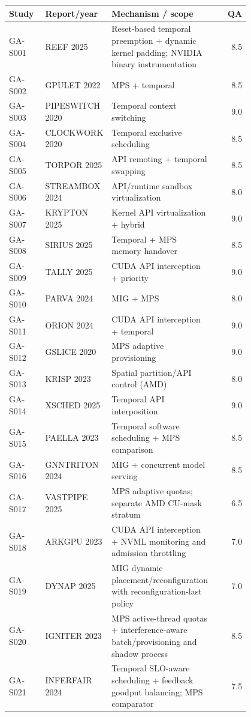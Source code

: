 \documentclass[12pt,a4paper]{article}
\begin{document}
\begin{longtable}{P{0.15\linewidth}P{0.25\linewidth}P{0.4\linewidth}r}
\toprule Study & Report/year & Mechanism / scope & QA\\\midrule\endhead
GA-S001 & REEF 2025 \cite{reef} & Reset-based temporal preemption + dynamic kernel padding; NVIDIA binary instrumentation & 8.5\\
GA-S002 & GPULET 2022 \cite{gpulet} & MPS + temporal & 8.5\\
GA-S003 & PIPESWITCH 2020 \cite{pipeswitch} & Temporal context switching & 9.0\\
GA-S004 & CLOCKWORK 2020 \cite{clockwork} & Temporal exclusive scheduling & 8.5\\
GA-S005 & TORPOR 2025 \cite{torpor} & API remoting + temporal swapping & 8.5\\
GA-S006 & STREAMBOX 2024 \cite{streambox} & API/runtime sandbox virtualization & 8.0\\
GA-S007 & KRYPTON 2025 \cite{krypton} & Kernel API virtualization + hybrid & 9.0\\
GA-S008 & SIRIUS 2025 \cite{sirius} & Temporal + MPS memory handover & 8.5\\
GA-S009 & TALLY 2025 \cite{tally} & CUDA API interception + priority & 9.0\\
GA-S010 & PARVA 2024 \cite{parva} & MIG + MPS & 8.0\\
GA-S011 & ORION 2024 \cite{orion} & CUDA API interception + temporal & 9.0\\
GA-S012 & GSLICE 2020 \cite{gslice} & MPS adaptive provisioning & 9.0\\
GA-S013 & KRISP 2023 \cite{krisp} & Spatial partition/API control (AMD) & 8.0\\
GA-S014 & XSCHED 2025 \cite{xsched} & Temporal API interposition & 9.0\\
GA-S015 & PAELLA 2023 \cite{paella} & Temporal software scheduling + MPS comparison & 8.5\\
GA-S016 & GNNTRITON 2024 \cite{gnntriton} & MIG + concurrent model serving & 8.5\\
GA-S017 & VASTPIPE 2025 \cite{vastpipe} & MPS adaptive quotas; separate AMD CU-mask stratum & 6.5\\
GA-S018 & ARKGPU 2023 \cite{arkgpu} & CUDA API interception + NVML monitoring and admission throttling & 7.0\\
GA-S019 & DYNAP 2025 \cite{dynap} & MIG dynamic placement/reconfiguration with reconfiguration-last policy & 7.0\\
GA-S020 & IGNITER 2023 \cite{igniter} & MPS active-thread quotas + interference-aware batch/provisioning and shadow process & 8.5\\
GA-S021 & INFERFAIR 2024 \cite{inferfair} & Temporal SLO-aware scheduling + feedback goodput balancing; MPS comparator & 7.5\\
\bottomrule\end{longtable}
\end{document}

